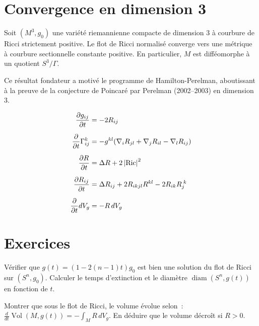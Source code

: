 \section{Convergence en dimension 3}

\begin{theoreme}[Hamilton, 1982]
\label{thm:hamilton_3d}
Soit $(M^3, g_0)$ une vari\'et\'e riemannienne compacte de dimension $3$ \`a courbure
de Ricci strictement positive. Le flot de Ricci normalis\'e converge vers une m\'etrique
\`a courbure sectionnelle constante positive. En particulier, $M$ est diff\'eomorphe
\`a un quotient $S^3/\Gamma$.
\end{theoreme}

\begin{remarque}
Ce r\'esultat fondateur a motiv\'e le programme de Hamilton-Perelman, aboutissant
\`a la preuve de la conjecture de Poincar\'e par Perelman (2002--2003) en dimension $3$.
\end{remarque}

\begin{formules}[title=\textbf{\'Equations d'\'evolution sous le flot de Ricci}]
\begin{align*}
    \frac{\partial g_{ij}}{\partial t} &= -2R_{ij} \\[6pt]
    \frac{\partial}{\partial t}\Gamma_{ij}^k &= -g^{kl}(\nabla_i R_{jl}
        + \nabla_j R_{il} - \nabla_l R_{ij}) \\[6pt]
    \frac{\partial R}{\partial t} &= \Delta R + 2\left| \operatorname{Ric} \right|^2 \\[6pt]
    \frac{\partial R_{ij}}{\partial t} &= \Delta R_{ij} + 2R_{ikjl}R^{kl}
        - 2R_{ik}R_j^{\;k} \\[6pt]
    \frac{\partial}{\partial t}dV_g &= -R\, dV_g
\end{align*}
\end{formules}

\section{Exercices}

\begin{exercice}
V\'erifier que $g(t) = (1 - 2(n-1)t) g_0$ est bien une solution du flot de Ricci
sur $(S^n, g_0)$. Calculer le temps d'extinction et le diam\`etre $\operatorname{diam}(S^n, g(t))$
en fonction de $t$.
\end{exercice}

\begin{exercice}
Montrer que sous le flot de Ricci, le volume \'evolue selon~:
$\frac{d}{dt}\operatorname{Vol}(M, g(t)) = -\int_M R\, dV_g$.
En d\'eduire que le volume d\'ecro\^it si $R > 0$.
\end{exercice}

